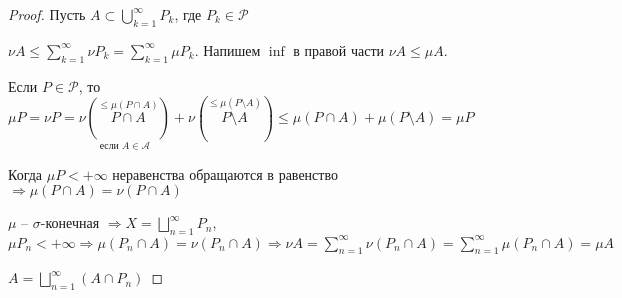 \begin{proof}
    Пусть $A\subset \bigcup\limits_{k=1}^\infty P_k$, где $P_k\in\mathcal{P}$

    $\nu A \leq \sum\limits_{k=1}^\infty \nu P_k=\sum\limits_{k=1}^\infty \mu P_k$. Напишем $\inf$ в правой части $\nu A\leq \mu A$.

    Если $P\in\mathcal{P}$, то $\mu P = \nu P=\underset{\text{если }A\in\mathcal{A}}{\nu (\overset{\leq \mu (P\cap A)}{P\cap A})}+\nu (\overset{\leq \mu (P\setminus A)}{P\setminus A})\leq \mu (P\cap A)+\mu (P\setminus A)= \mu P$

    Когда $\mu P<+\infty$ неравенства обращаются в равенство $\Rightarrow \mu (P\cap A) = \nu(P\cap A)$

    $\mu$ – $\sigma$-конечная $\Rightarrow X= \bigsqcup \limits_{n=1}^\infty P_n$, $\mu P_n <+\infty\Rightarrow
    \mu (P_n \cap A)= \nu (P_n \cap A)\Rightarrow \nu A = 
    \sum \limits_{n=1}^\infty \nu (P_n \cap A)=\sum \limits_{n=1}^\infty \mu (P_n \cap A)=\mu A$

    $A= \bigsqcup \limits_{n=1}^\infty (A \cap P_n)$
\end{proof}
